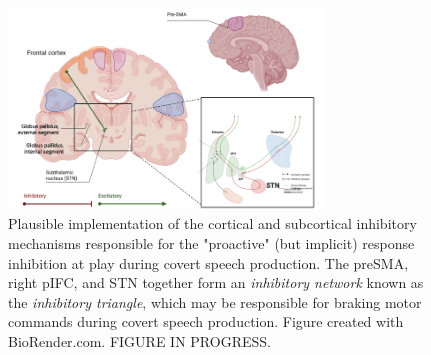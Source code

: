 \documentclass[utf8]{template/frontiersSCNS} %
\begin{document}
\begin{figure}[ht] %
\begin{center}
\includegraphics[width=0.75\textwidth]{figures/inhibitory_triangle.png} %
\end{center}
\caption{Plausible implementation of the cortical and subcortical inhibitory mechanisms responsible for the "proactive" (but implicit) response inhibition at play during covert speech production. The preSMA, right pIFC, and STN together form an \textit{inhibitory network} known as the \textit{inhibitory triangle}, which may be responsible for braking motor commands during covert speech production. Figure created with BioRender.com. FIGURE IN PROGRESS.}\label{fig:2}
\end{figure}

\end{document}
